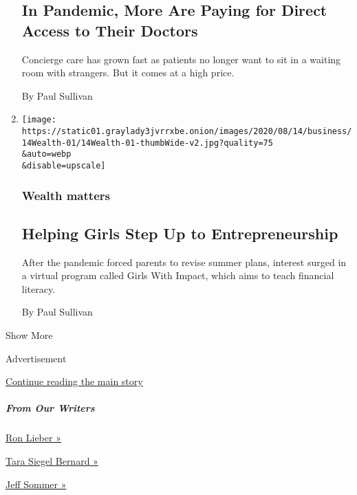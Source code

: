 \begin{enumerate}
  \hypertarget{in-pandemic-more-are-paying-for-direct-access-to-their-doctors}{%
  \subsection{In Pandemic, More Are Paying for Direct Access to Their
  Doctors}\label{in-pandemic-more-are-paying-for-direct-access-to-their-doctors}}

  Concierge care has grown fast as patients no longer want to sit in a
  waiting room with strangers. But it comes at a high price.

  By Paul Sullivan
\item
  \href{/2020/08/14/your-money/girls-entrepreneurship-financial-literacy.html}{}

  \texttt{[image: https://static01.graylady3jvrrxbe.onion/images/2020/08/14/business/14Wealth-01/14Wealth-01-thumbWide-v2.jpg?quality=75\\\&auto=webp\\\&disable=upscale]}

  \hypertarget{wealth-matters-4}{%
  \subsubsection{Wealth matters}\label{wealth-matters-4}}

  \hypertarget{helping-girls-step-up-to-entrepreneurship}{%
  \subsection{Helping Girls Step Up to
  Entrepreneurship}\label{helping-girls-step-up-to-entrepreneurship}}

  After the pandemic forced parents to revise summer plans, interest
  surged in a virtual program called Girls With Impact, which aims to
  teach financial literacy.

  By Paul Sullivan
\end{enumerate}

Show More

Advertisement

\protect\hyperlink{after-mid1}{Continue reading the main story}

\hypertarget{from-our-writers}{%
\subparagraph{From Our Writers}\label{from-our-writers}}

\href{https://www.nytimes3xbfgragh.onion/by/ron-lieber}{Ron Lieber »}

\href{https://www.nytimes3xbfgragh.onion/by/tara-siegel-bernard}{Tara
Siegel Bernard »}

\href{https://www.nytimes3xbfgragh.onion/by/jeff-sommer}{Jeff Sommer »}


